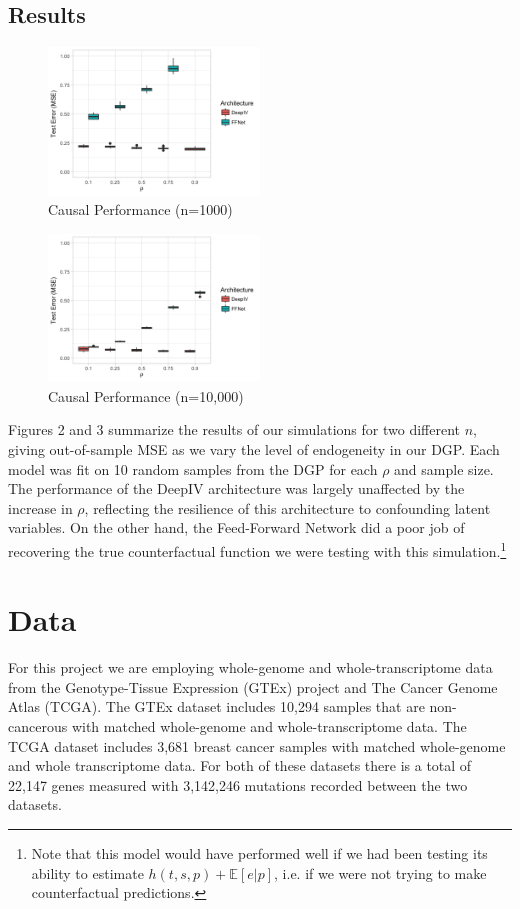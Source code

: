 \documentclass[10.5pt, oneside, twocolumn]{article}   	%
\begin{document}
\subsection{Results} 
\begin{figure}[h]
	\caption{Causal Performance (n=1000)}
	\centering
	\includegraphics[width=0.5\textwidth]{perf_small.png}
\end{figure}

\begin{figure}[h]
	\caption{Causal Performance (n=10,000)}
	\centering
	\includegraphics[width=0.5\textwidth]{perf_big.png}
\end{figure}

Figures 2 and 3 summarize the results of our simulations for two different $n$, giving out-of-sample MSE as we vary the level of endogeneity in our DGP. Each model was fit on 10 random samples from the DGP for each $\rho$ and sample size. The performance of the DeepIV architecture was largely unaffected by the increase in $\rho$, reflecting the resilience of this architecture to confounding latent variables. On the other hand, the Feed-Forward Network did a poor job of recovering the true counterfactual function we were testing with this simulation.\footnote{Note that this model would have performed well if we had been testing its ability to estimate $h(t, s, p) + \mathbb{E}[e | p]$, i.e. if we were not trying to make counterfactual predictions.}

\section{Data}
For this project we are employing whole-genome and whole-transcriptome data from the Genotype-Tissue Expression (GTEx) project and The Cancer Genome Atlas (TCGA). The GTEx dataset includes 10,294 samples that are non-cancerous with matched whole-genome and whole-transcriptome data. The TCGA dataset includes 3,681 breast cancer samples with matched whole-genome and whole transcriptome data. For both of these datasets there is a total of 22,147 genes measured with 3,142,246 mutations recorded between the two datasets.\\
\end{document}
